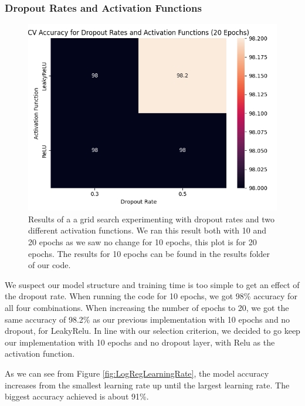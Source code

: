 \subsubsection{Dropout Rates and Activation Functions}
\begin{figure}[H]
    \centering
    \includegraphics[width=\textwidth]{results/cnn_grid_search/heatmap_grid_search_da.png}
    \caption{Results of a a grid search experimenting with dropout rates and two different activation functions. We ran this result both with 10 and 20 epochs as we saw no change for 10 epochs, this plot is for 20 epochs. The results for 10 epochs can be found in the results folder of our code.}
    \label{fig:cnn_pp}
\end{figure}

We suspect our model structure and training time is too simple to get an effect of the dropout rate. When running the code for 10 epochs, we got 98\% accuracy for all four combinations. When increasing the number of epochs to 20, we got the same accuracy of 98.2\% as our previous implementation with 10 epochs and no dropout, for LeakyRelu. In line with our selection criterion, we decided to go keep our implementation with 10 epochs and no dropout layer, with Relu as the activation function. 

\newpage
As we can see from Figure \ref{fig:LogRegLearningRate}, the model accuracy increases from the smallest learning rate up until the largest learning rate. The biggest accuracy achieved is about 91\%.

